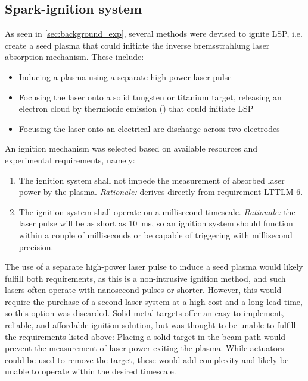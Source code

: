         \subsection{Spark-ignition system} \label{sec:sparkignition}
            As seen in \autoref{sec:background_exp}, several methods were devised to ignite LSP, i.e. create a seed plasma that could initiate the inverse bremsstrahlung laser absorption mechanism. These include:
            \begin{itemize}
                \item Inducing a plasma using a separate high-power laser pulse
                \item Focusing the laser onto a solid tungsten or titanium target, releasing an electron cloud by thermionic emission (\textcite{schwartzLasersustainedGasPlasmas1989}) that could initiate LSP
                \item Focusing the laser onto an electrical arc discharge across two electrodes
            \end{itemize}
            An ignition mechanism was selected based on available resources and experimental requirements, namely:
            \begin{enumerate}
                \item The ignition system shall not impede the measurement of absorbed laser power by the plasma. \emph{Rationale:} derives directly from requirement LTTLM-6.
                \item The ignition system shall operate on a millisecond timescale. \emph{Rationale:} the laser pulse will be as short as 10~ms, so an ignition system should function within a couple of milliseconds or be capable of triggering with millisecond precision.
            \end{enumerate}
            The use of a separate high-power laser pulse to induce a seed plasma would likely fulfill both requirements, as this is a non-intrusive ignition method, and such lasers often operate with nanosecond pulses or shorter. However, this would require the purchase of a second laser system at a high cost and a long lead time, so this option was discarded. Solid metal targets offer an easy to implement, reliable, and affordable ignition solution, but was thought to be unable to fulfill the requirements listed above: Placing a solid target in the beam path would prevent the measurement of laser power exiting the plasma. While actuators could be used to remove the target, these would add complexity and likely be unable to operate within the desired timescale.

